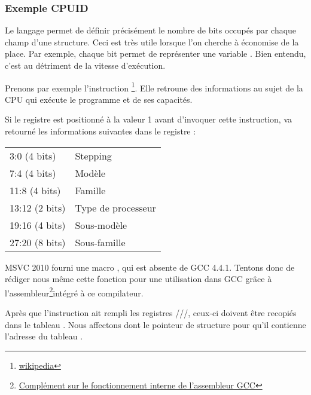 ﻿\subsubsection{Exemple CPUID}

Le langage \CCpp permet de définir précisément le nombre de bits occupés par chaque champ d'une structure. 
Ceci est très utile lorsque l'on cherche à économise de la place. Par exemple, chaque bit permet de 
représenter une variable \Tbool. Bien entendu, c'est au détriment de la vitesse d'exécution.

\newcommand{\FNCPUID}{\footnote{\href{http://go.yurichev.com/17069}{wikipedia}}}

\label{cpuid}

Prenons par exemple l'instruction \CPUID\FNCPUID. Elle retroune des informations au sujet de la CPU qui 
exécute le programme et de ses capacités.

Si le registre \EAX est positionné à la valeur 1 avant d'invoquer cette instruction, \CPUID va retourné 
les informations suivantes dans le registre \EAX:

\begin{center}
\begin{tabular}{ | l | l | }
\hline
3:0 (4 bits)& Stepping \\
7:4 (4 bits) & Modèle \\
11:8 (4 bits) & Famille \\
13:12 (2 bits) & Type de processeur \\
19:16 (4 bits) & Sous-modèle \\
27:20 (8 bits) & Sous-famille \\
\hline
\end{tabular}
\end{center}

\newcommand{\FNGCCAS}{\footnote{\href{http://go.yurichev.com/17070}
{Complément sur le fonctionnement interne de l'assembleur GCC}}}

MSVC 2010 fourni une macro \CPUID, qui est absente de GCC 4.4.1. Tentons donc de rédiger nous même cette 
fonction pour une utilisation dans GCC grâce à l'assembleur\FNGCCAS intégré à ce compilateur.



Après que l'instruction \CPUID ait rempli les registres \EAX/\EBX/\ECX/\EDX, ceux-ci doivent être recopiés 
dans le tableau . Nous affectons dont le pointeur de structure  pour qu'il 
contienne l'adresse du tableau .

